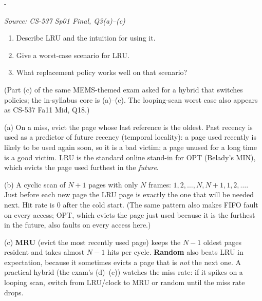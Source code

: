 \documentclass[11pt,a4paper]{article}
\makeatletter
\newcommand{\keepspace}[1]{\par\penalty-100\begingroup
  \setlength{\dimen@}{#1}\dimen@ii\pagegoal\advance\dimen@ii-\pagetotal
  \ifdim\dimen@>\dimen@ii\ifdim\dimen@ii>\z@\vfil\fi\break\fi\endgroup}
\newcounter{qn}[section]
\newenvironment{Qn}[4]{%
  \refstepcounter{qn}\keepspace{7\baselineskip}%
  \begin{tcolorbox}[qboxstyle, title={Q\thesection.\theqn\ \ [#1 \textbar\ #2]\ \ #4}]%
  {\footnotesize\color{g3}\textit{Source: #3}}\par\smallskip%
}{%
  \end{tcolorbox}%
}
\newenvironment{Sol}{%
  \begin{tcolorbox}[sboxstyle, title={Solution}]%
}{%
  \end{tcolorbox}\vspace{0.35em}%
}
\makeatother
\begin{document}
\begin{Qn}{Medium-Hard}{Lect 15}{CS-537 Sp01 Final, Q3(a)--(c)}{LRU intuition, the cyclic worst case, and a policy that beats it}
\begin{enumerate}
  \item[(a)] Describe LRU and the intuition for using it.
  \item[(b)] Give a worst-case scenario for LRU.
  \item[(c)] What replacement policy works well on that scenario?
\end{enumerate}
(Part (c) of the same MEMS-themed exam asked for a hybrid that switches
policies; the in-syllabus core is (a)--(c). The looping-scan worst case
also appears as CS-537 Fa11 Mid, Q18.)
\end{Qn}
\begin{Sol}
(a) On a miss, evict the page whose last reference is the oldest. Past
recency is used as a predictor of future recency (temporal locality):
a page used recently is likely to be used again soon, so it is a bad
victim; a page unused for a long time is a good victim. LRU is the
standard online stand-in for OPT (Belady's MIN), which evicts the page
used furthest in the \emph{future}.

(b) A cyclic scan of $N+1$ pages with only $N$ frames:
$1,2,\ldots,N,N+1,1,2,\ldots$. Just before each new page the LRU page
is exactly the one that will be needed next. Hit rate is 0 after the
cold start. (The same pattern also makes FIFO fault on every access;
OPT, which evicts the page just used because it is the furthest in the
future, also faults on every access here.)

(c) \textbf{MRU} (evict the most recently used page) keeps the $N-1$
oldest pages resident and takes almost $N-1$ hits per cycle.
\textbf{Random} also beats LRU in expectation, because it sometimes
evicts a page that is \emph{not} the next one. A practical hybrid
(the exam's (d)--(e)) watches the miss rate: if it spikes on a looping
scan, switch from LRU/clock to MRU or random until the miss rate
drops.
\end{Sol}
\end{document}

